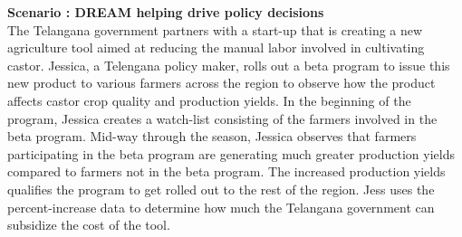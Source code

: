 \begin{flushleft}
\textbf{Scenario : DREAM helping drive policy decisions}\\\smallskip
The Telangana government partners with a start-up that is creating a new agriculture tool aimed at reducing the manual labor involved in cultivating castor. Jessica, a Telengana policy maker, rolls out a beta program to issue this new product to various farmers across the region to observe how the product affects castor crop quality and production yields. In the beginning of the program, Jessica creates a watch-list consisting of the farmers involved in the beta program. Mid-way through the season, Jessica observes that farmers participating in the beta program are generating much greater production yields compared to farmers not in the beta program. The increased production yields qualifies the program to get rolled out to the rest of the region. Jess uses the percent-increase data to determine how much the Telangana government can subsidize the cost of the tool. 
\end{flushleft}
